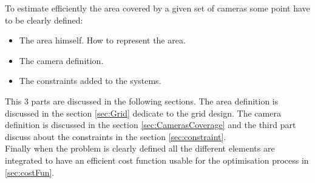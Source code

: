 


To estimate efficiently the area covered by a given set of cameras some point have to be clearly defined: 
\begin{itemize}
\item The area himself. How to represent the area. 
\item The camera definition. 
\item The constraints added to the systems. \\
\end{itemize} 
 This 3 parts are discussed in the following sections. The area definition is discussed in the section \ref{sec:Grid} dedicate to the grid design. The camera definition is discussed in the section \ref{sec:CamerasCoverage} and the third part discuss about the constraints in the section \ref{sec:constraint}.\\
Finally when the problem is clearly defined all the different elements are integrated to have an efficient cost function usable for the optimisation process in \ref{sec:costFun}.

   
%
%
% 

